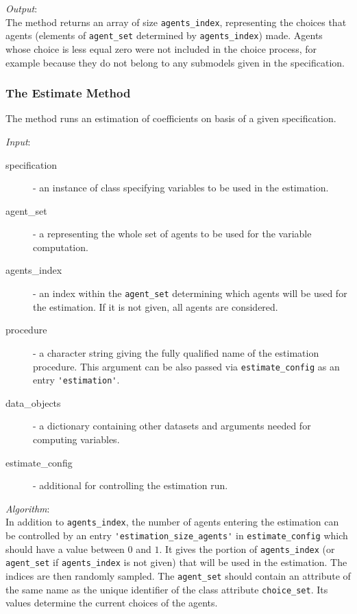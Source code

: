{{\it Output}:~\\[1mm]
The method returns an array of size \verb|agents_index|, representing the
choices that agents (elements of \verb|agent_set| determined by
\verb|agents_index|) made. Agents whose choice is less equal zero  were
not included in the choice process, for example because they do not belong to
any submodels given in the specification.

\subsubsection{The Estimate Method}
%
The  method runs an estimation of coefficients \coefficientsindex on basis of
a given specification.

{\it Input}:
\begin{description}
\item[specification] - an instance of class 
  specifying variables \variablesindex to be used in the estimation.
\item[agent_set] - a  \datasetindex representing the whole set of agents
  to be used for the variable \variablesindex computation.
\item[agents_index] - an index within the \verb|agent_set| determining which
  agents will be used for the estimation. If it is not given, all agents are
  considered.
\item[procedure] - a character string giving the fully qualified name of the
  estimation procedure. This argument can be also passed via
  \verb|estimate_config| as an entry \verb|'estimation'|.
\item[data_objects] - a dictionary containing other datasets \datasetindex and arguments
  needed for computing variables. \variablesindex
\item[estimate_config] - additional  for controlling the
  estimation run.
\end{description}

{\it Algorithm}:~\\[1mm]
In addition to \verb|agents_index|, the number of agents entering the
estimation can be controlled by an entry \verb|'estimation_size_agents'| in
\verb|estimate_config| which should have a value between $0$ and $1$. It gives
the portion of \verb|agents_index| (or \verb|agent_set| if \verb|agents_index|
is not given) that will be used in the estimation. The indices are then
randomly sampled. The \verb|agent_set| should contain an attribute \attributesindex of the same
name as the unique identifier of the class attribute \attributesindex \verb|choice_set|. Its
values determine the current choices of the agents.

}

